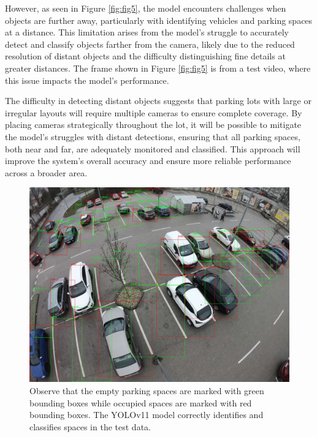 \documentclass[conference]{IEEEtran}
\begin{document}
However, 
as seen in Figure \ref{fig:fig5}, 
the model encounters challenges when objects are further away, 
particularly with identifying vehicles and parking spaces at a distance. 
This limitation arises from the model's struggle to accurately detect and classify objects farther from the camera, 
likely due to the reduced resolution of distant objects and the difficulty distinguishing fine details at greater distances. 
The frame shown in Figure \ref{fig:fig5} is from a test video, 
where this issue impacts the model’s performance.

The difficulty in detecting distant objects suggests that parking lots with large or irregular layouts will require multiple cameras to ensure complete coverage. 
By placing cameras strategically throughout the lot, 
it will be possible to mitigate the model's struggles with distant detections, 
ensuring that all parking spaces, 
both near and far, 
are adequately monitored and classified. 
This approach will improve the system's overall accuracy and ensure more reliable performance across a broader area.

\begin{figure}[h]
    \centering
    \includegraphics[scale=0.065]{Figure_4.JPG}
    \caption{
        Observe that the empty parking spaces are marked with green bounding boxes while occupied spaces are marked with red bounding boxes. 
        The YOLOv11 model correctly identifies and classifies spaces in the test data.
    }
    \label{fig:fig4}
\end{figure}
\end{document}
